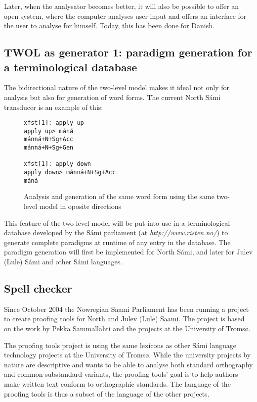 \documentclass[a4paper,english]{article}
\begin{document}
Later, when the analysator becomes better, it will also be possible to offer an open system, where the computer analyses user input and offers an interface for the user to analyse for himself. Today, this has been done for Danish.

\subsection{TWOL as generator 1: paradigm generation for a terminological database}\label{term}

The bidirectional nature of the two-level model makes it ideal not only for analysis but also for generation of word forms. The current North Sámi transducer is an example of this:

\begin{figure}[htdp]
\caption{Analysis and generation of the same word form using the same two-level model in oposite directions}
\begin{center}
\begin{verbatim}
xfst[1]: apply up
apply up> máná
mánná+N+Sg+Acc
mánná+N+Sg+Gen

xfst[1]: apply down
apply down> mánná+N+Sg+Acc
máná
\end{verbatim}
\end{center}
\label{anagen}
\end{figure}%

This feature of the two-level model will be put into use in a terminological database developed by the Sámi parliament (at \textit{http://www.risten.no/}) to generate complete paradigms at runtime of any entry in the database. The paradigm generation will first be implemented for North Sámi, and later for Julev (Lule) Sámi and other Sámi languages.


\subsection{Spell checker}\label{spell}

Since October 2004 the Nowregian Saami Parliament has been running a project to create proofing tools for North and Julev (Lule) Saami. The project is based on the work by Pekka Sammallahti and the projects at the University of Tromsø.

The proofing tools project is using the same lexicons as other Sámi language technology projects at the University of Tromsø. While the university projects by nature are descriptive and wants to be able to analyse both standard orthography and common substandard variants, the proofing tools' goal is to help authors make written text conform to orthographic standards. The language of the proofing tools is thus a subset of the language of the other projects.
\end{document}

